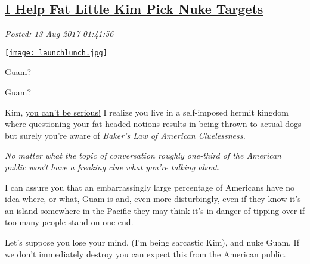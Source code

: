 %

\subsection*{\href{http://analyzethedatanotthedrivel.org/2017/08/12/i-help-fat-little-kim-pick-nuke-targets/}{I Help Fat Little Kim Pick Nuke Targets}}


\noindent\emph{Posted: 13 Aug 2017 01:41:56}
\vspace{6pt}


 \captionsetup[floatingfigure]{labelformat=empty}
 \begin{floatingfigure}[r]{0.25\textwidth}
 \centering
 \href{http://picphotos.net/kim-jong-un-fat-meme/}{\texttt{[image: launchlunch.jpg]}}
 \label{fig:5395x0}
 \end{floatingfigure}

Guam?

Guam?

Kim, \href{https://www.youtube.com/watch?v=t0hK1wyrrAU}{you can't be serious!} I realize you live in a self-imposed hermit
kingdom where questioning your fat headed notions results in
\href{http://www.nydailynews.com/news/world/kim-jong-executed-uncle-feeding-pack-starving-dogs-article-1.1565299}{being
thrown to actual dogs} but surely you're aware of \emph{Baker's Law of
American Cluelessness.}

\medskip

\emph{No matter what the topic of conversation roughly one-third of the
American public won't have a freaking clue what you're talking about.}

\medskip

I can assure you that an embarrassingly large percentage of Americans
have no idea where, or what, Guam is and, even more disturbingly,
even if they know it's an island somewhere in the Pacific they may
think \href{http://www.snopes.com/politics/quotes/guamtip.asp}{it's in
danger of tipping over} if too many people stand on one end.

Let's suppose you lose your mind, (I'm being sarcastic Kim), and nuke
Guam. If we don't immediately destroy you can expect this from the
American public.

